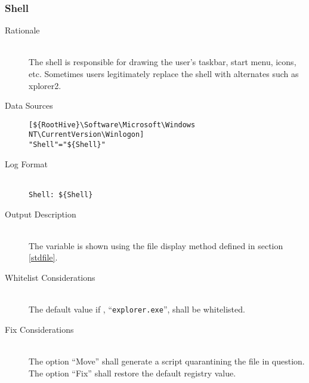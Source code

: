 \subsubsection{Shell}
\begin{description}
\item[Rationale] \hfill \\
The shell is responsible for drawing the user's taskbar, start menu, icons, etc.
Sometimes users legitimately replace the shell with alternates such as xplorer2.
\item[Data Sources] \hfill
\vspace{-\baselineskip}
\begin{verbatim}
[${RootHive}\Software\Microsoft\Windows NT\CurrentVersion\Winlogon]
"Shell"="${Shell}"
\end{verbatim}
\item[Log Format] \hfill \\
\verb|Shell: ${Shell}|
\item[Output Description] \hfill \\
The variable  is shown using the file display method defined in
section \ref{stdfile}.
\item[Whitelist Considerations] \hfill \\
The default value if , ``\verb|explorer.exe|'', shall be whitelisted.
\item[Fix Considerations] \hfill \\
The option ``Move'' shall generate a script quarantining the file in question.
The option ``Fix'' shall restore the default registry value.
\end{description}

